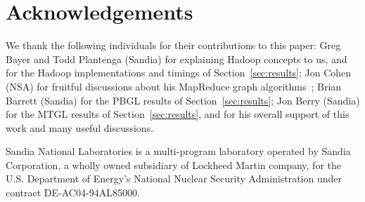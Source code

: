 \section{Acknowledgements}
\label{sec:thanks}

We thank the following individuals for their contributions to this
paper: Greg Bayer and Todd Plantenga (Sandia) for explaining Hadoop
concepts to us, and for the Hadoop implementations and timings of
Section~\ref{sec:results}; Jon Cohen (NSA) for fruitful discussions
about his MapReduce graph algorithms~\cite{Cohen09}; Brian Barrett
(Sandia) for the PBGL results of Section~\ref{sec:results}; Jon Berry
(Sandia) for the MTGL results of Section~\ref{sec:results}, and for
his overall support of this work and many useful discussions.

Sandia National Laboratories is a multi-program laboratory operated by
Sandia Corporation, a wholly owned subsidiary of Lockheed Martin
company, for the U.S. Department of Energy's National Nuclear Security
Administration under contract DE-AC04-94AL85000.
